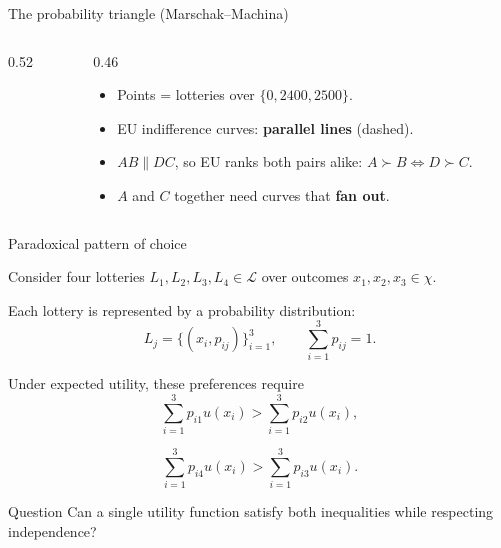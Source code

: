 \documentclass[12pt]{beamer}
\begin{document}
\begin{frame}{The probability triangle (Marschak--Machina)}
\small
\begin{columns}[c]
\begin{column}{0.52\textwidth}
\centering
{}
\end{column}
\begin{column}{0.46\textwidth}
\begin{itemize}
\small
  \item Points = lotteries over $\{0,2400,2500\}$.
  \item EU indifference curves: \textbf{parallel lines} (dashed).
  \item $AB \parallel DC$, so EU ranks both pairs alike: $A\succ B \Leftrightarrow D\succ C$.
  \item $A$ and $C$ together need curves that \textbf{fan out}.
\end{itemize}
\end{column}
\end{columns}
\end{frame}

\begin{frame}{Paradoxical pattern of choice}
\scriptsize

Consider four lotteries $L_1,L_2,L_3,L_4 \in \mathcal{L}$ over outcomes $x_1,x_2,x_3 \in \chi$.

Each lottery is represented by a probability distribution:
\[
L_j=\{(x_i,p_{ij})\}_{i=1}^3,
\qquad
\sum_{i=1}^3p_{ij}=1.
\]

Under expected utility, these preferences require
\[
\sum_{i=1}^3p_{i1}u(x_i)>
\sum_{i=1}^3p_{i2}u(x_i),
\]

\[
\sum_{i=1}^3p_{i4}u(x_i)>
\sum_{i=1}^3p_{i3}u(x_i).
\]

\begin{block}{Question}
Can a single utility function satisfy both inequalities
while respecting independence?
\end{block}

\end{frame}
\end{document}
